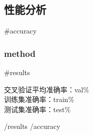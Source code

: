 \subsection{性能分析}
{{#accuracy}}
\subsubsection{{{method}}}
{{#results}}
\begin{train}
    交叉验证平均准确率：{{val}}\% \\  训练集准确率：{{train}}\% \\  测试集准确率：{{test}}\%
\end{train}
{{/results}}
{{/accuracy}}
